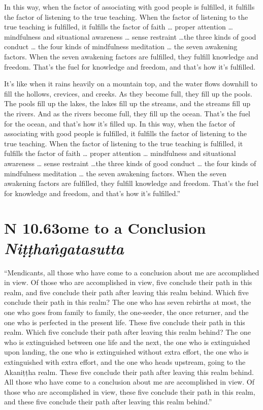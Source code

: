 \documentclass[12pt,openany]{book}%
\newcommand*{\suttatitleacronym}[1]{\smaller[2]{#1}\vspace*{.3em}}
\newcommand*{\suttatitletranslation}[1]{\linebreak{#1}}
\newcommand*{\suttatitleroot}[1]{\linebreak\smaller[2]\itshape{#1}}
\newcommand*{\tocacronym}[1]{\hspace*{-3.3em}{#1}\quad}
\newcommand*{\toctranslation}[1]{#1}
\newcommand*{\tocroot}[1]{(\textit{#1})}
\begin{document}
In this way, when the factor of associating with good people is fulfilled, it fulfills the factor of listening to the true teaching. When the factor of listening to the true teaching is fulfilled, it fulfills the factor of faith … proper attention … mindfulness and situational awareness … sense restraint …the three kinds of good conduct … the four kinds of mindfulness meditation … the seven awakening factors. When the seven awakening factors are fulfilled, they fulfill knowledge and freedom. That’s the fuel for knowledge and freedom, and that’s how it’s fulfilled. 

It’s like when it rains heavily on a mountain top, and the water flows downhill to fill the hollows, crevices, and creeks. As they become full, they fill up the pools. The pools fill up the lakes, the lakes fill up the streams, and the streams fill up the rivers. And as the rivers become full, they fill up the ocean. That’s the fuel for the ocean, and that’s how it’s filled up. In this way, when the factor of associating with good people is fulfilled, it fulfills the factor of listening to the true teaching. When the factor of listening to the true teaching is fulfilled, it fulfills the factor of faith … proper attention … mindfulness and situational awareness … sense restraint …the three kinds of good conduct … the four kinds of mindfulness meditation … the seven awakening factors. When the seven awakening factors are fulfilled, they fulfill knowledge and freedom. That’s the fuel for knowledge and freedom, and that’s how it’s fulfilled.” 

%
\section*{{\suttatitleacronym AN 10.63}{\suttatitletranslation Come to a Conclusion }{\suttatitleroot Niṭṭhaṅgatasutta}}
\addcontentsline{toc}{section}{\tocacronym{AN 10.63} \toctranslation{Come to a Conclusion } \tocroot{Niṭṭhaṅgatasutta}}

“Mendicants, all those who have come to a conclusion about me are accomplished in view. Of those who are accomplished in view, five conclude their path in this realm, and five conclude their path after leaving this realm behind. Which five conclude their path in this realm? The one who has seven rebirths at most, the one who goes from family to family, the one-seeder, the once returner, and the one who is perfected in the present life. These five conclude their path in this realm. Which five conclude their path after leaving this realm behind? The one who is extinguished between one life and the next, the one who is extinguished upon landing, the one who is extinguished without extra effort, the one who is extinguished with extra effort, and the one who heads upstream, going to the \textsanskrit{Akaniṭṭha} realm. These five conclude their path after leaving this realm behind. All those who have come to a conclusion about me are accomplished in view. Of those who are accomplished in view, these five conclude their path in this realm, and these five conclude their path after leaving this realm behind.” 
\end{document}
